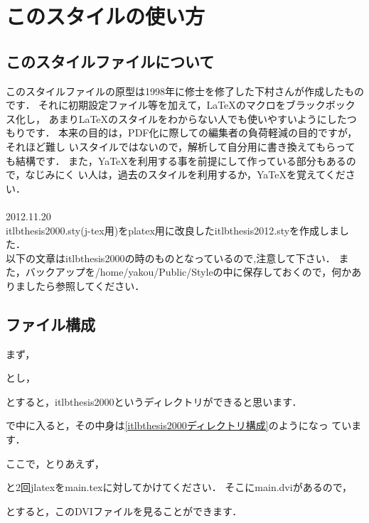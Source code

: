 
\chapter{このスタイルの使い方}
\section{このスタイルファイルについて}
このスタイルファイルの原型は1998年に修士を修了した下村さんが作成したもの
です．
それに初期設定ファイル等を加えて，LaTeXのマクロをブラックボックス化し，
あまりLaTeXのスタイルをわからない人でも使いやすいようにしたつもりです．
本来の目的は，PDF化に際しての編集者の負荷軽減の目的ですが，それほど難し
いスタイルではないので，解析して自分用に書き換えてもらっても結構です．
また，YaTeXを利用する事を前提にして作っている部分もあるので，なじみにく
い人は，過去のスタイルを利用するか，YaTeXを覚えてください．\\
\\
2012.11.20\\
itlbthesis2000.sty(j-tex用)をplatex用に改良したitlbthesis2012.styを作成しました．\\
以下の文章はitlbthesis2000の時のものとなっているので,注意して下さい．
また，バックアップを/home/yakou/Public/Styleの中に保存しておくので，何かありましたら参照してください．
\\
\section{ファイル構成}
まず，


とし，


とすると，itlbthesis2000というディレクトリができると思います．


で中に入ると，その中身は\ref{itlbthesis2000ディレクトリ構成}のようになっ
ています．

ここで，とりあえず，



と2回jlatexをmain.texに対してかけてください．
そこにmain.dviがあるので，


とすると，このDVIファイルを見ることができます．
